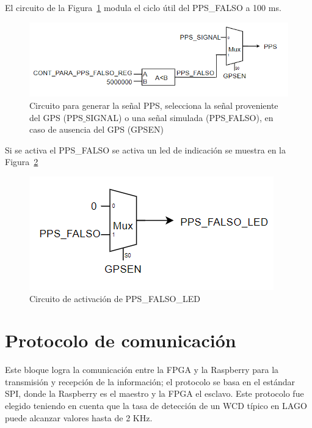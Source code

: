 El circuito de la Figura~\ref{comparafalso} modula el ciclo útil del PPS\_FALSO a 100 ms.

\begin{figure}[H]
\includegraphics[scale=0.8]{Figs/PPSP.PNG} 
\centering
\caption[Circuito para generar la señal PPS]{Circuito para generar la señal PPS, selecciona la señal proveniente del GPS (PPS$\_$SIGNAL) o una señal simulada (PPS$\_$FALSO), en caso de ausencia del GPS (GPSEN)}
\label{comparafalso}
\end{figure}

Si se activa el PPS\_FALSO se activa un led de indicación se muestra en la Figura~\ref{ledfalso}
\begin{figure}[H]
\includegraphics[scale=0.8]{Figs/TRIGER5.PNG} 
\centering
\caption{Circuito de activación de PPS\_FALSO\_LED}
\label{ledfalso}
\end{figure}

\section{\textbf{Protocolo de comunicación}}
Este bloque logra la comunicación entre la FPGA y la Raspberry para la transmisión y recepción de la información; el protocolo se basa en el estándar SPI, donde la Raspberry es el maestro y la FPGA el esclavo. Este protocolo fue elegido teniendo en cuenta que la tasa de detección de un WCD típico en LAGO puede alcanzar valores hasta de 2 KHz.~\citep{hernandez2018procedimiento}

